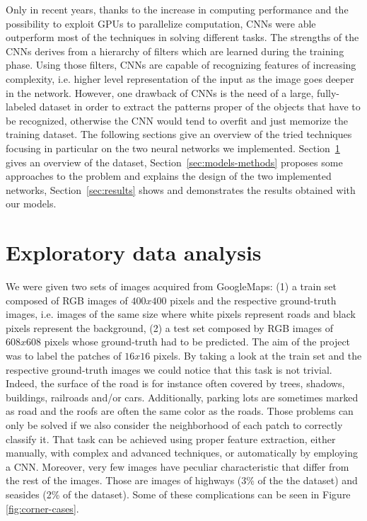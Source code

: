 \documentclass[10pt,conference,compsocconf]{IEEEtran}
\begin{document}
Only in recent years, thanks to the increase in computing performance and the possibility to exploit GPUs to parallelize computation, CNNs were able outperform most of the techniques in solving different tasks. The strengths of the CNNs derives from a hierarchy of filters which are learned during the training phase. Using those filters, CNNs are capable of recognizing features of increasing complexity, i.e. higher level representation of the input as the image goes deeper in the network. However, one drawback of CNNs is the need of a large, fully-labeled dataset in order to extract the patterns proper of the objects that have to be recognized, otherwise the CNN would tend to overfit and just memorize the training dataset.
The following sections give an overview of the tried techniques focusing in particular on the two neural networks we implemented. Section~\ref{sec:data-analysis} gives an overview of the dataset, Section~\ref{sec:models-methods} proposes some approaches to the problem and explains the design of the two implemented networks, Section~\ref{sec:results} shows and demonstrates the results obtained with our models.

\section{Exploratory data analysis}
\label{sec:data-analysis}
We were given two sets of images acquired from GoogleMaps: (1) a train set composed of RGB images of $400x400$ pixels and the respective ground-truth images, i.e. images of the same size where white pixels represent roads and black pixels represent the background, (2) a test set composed by RGB images of $608x608$ pixels whose ground-truth had to be predicted.
The aim of the project was to label the patches of $16x16$ pixels. By taking a look at the train set and the respective ground-truth images we could notice that this task is not trivial. Indeed, the surface of the road is for instance often covered by trees, shadows, buildings, railroads and/or cars. Additionally, parking lots are sometimes marked as road and the roofs are often the same color as the roads. Those problems can only be solved if we also consider the neighborhood of each patch to correctly classify it. That task can be achieved using proper feature extraction, either manually, with complex and advanced techniques, or automatically by employing a CNN. Moreover, very few images have peculiar characteristic that differ from the rest of the images. Those are images of highways (3\% of the the dataset) and seasides (2\% of the dataset). Some of these complications can be seen in Figure \ref{fig:corner-cases}.
\end{document}
